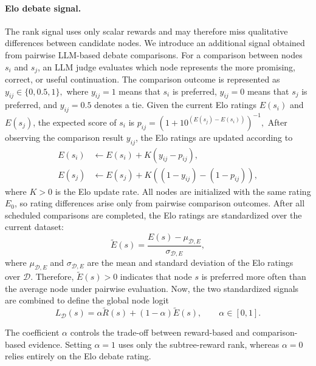 \documentclass{article} %
\begin{document}
\paragraph{Elo debate signal.}
The rank signal uses only scalar rewards and may therefore miss qualitative
differences between candidate nodes. We introduce an additional signal obtained
from pairwise LLM-based debate comparisons.
For a comparison between nodes $s_i$ and $s_j$, an LLM judge evaluates which
node represents the more promising, correct, or useful continuation. The
comparison outcome is represented as
$y_{ij}
\in
\{
0,0.5,1
\},$
where $y_{ij}=1$ means that $s_i$ is preferred, $y_{ij}=0$ means that $s_j$ is
preferred, and $y_{ij}=0.5$ denotes a tie.
Given the current Elo ratings $E(s_i)$ and $E(s_j)$, the expected score of
$s_i$ is
$p_{ij}
=
(1+10^{\left(E(s_j)-E(s_i)\right)})^{-1},$
After observing the comparison result $y_{ij}$, the Elo ratings are
updated according to
\begin{align*}
E(s_i)
&\leftarrow
E(s_i)
+
K\left(y_{ij}-p_{ij}\right),
\\
E(s_j)
&\leftarrow
E(s_j)
+
K\left((1-y_{ij})-(1-p_{ij})\right),
\end{align*}
where $K>0$ is the Elo update rate. All nodes are initialized with the same
rating $E_0$, so rating differences arise only from pairwise comparison
outcomes. 
After all scheduled comparisons are completed, the Elo ratings are standardized
over the current dataset:
\begin{equation*}
\widetilde{E}(s)
=
\frac{
E(s)-\mu_{\mathcal{D},E}
}{
\sigma_{\mathcal{D},E}
},
\end{equation*}
where $\mu_{\mathcal{D},E}$ and $\sigma_{\mathcal{D},E}$ are the
mean and standard deviation of the Elo ratings over $\mathcal{D}$. Therefore,
$\widetilde{E}(s)>0$ indicates that node $s$ is preferred more often than the
average node under pairwise evaluation.
Now, the two standardized signals are combined to define the global node logit
\begin{equation}
L_{\mathcal{D}}(s)
=
\alpha \widetilde{R}(s)
+
(1-\alpha)\widetilde{E}(s),
\qquad
\alpha\in[0,1].
\label{eq:globalrpiors}
\end{equation}

The coefficient $\alpha$ controls the trade-off between reward-based and
comparison-based evidence. Setting $\alpha=1$ uses only the subtree-reward rank,
whereas $\alpha=0$ relies entirely on the Elo debate rating. 
\end{document}
